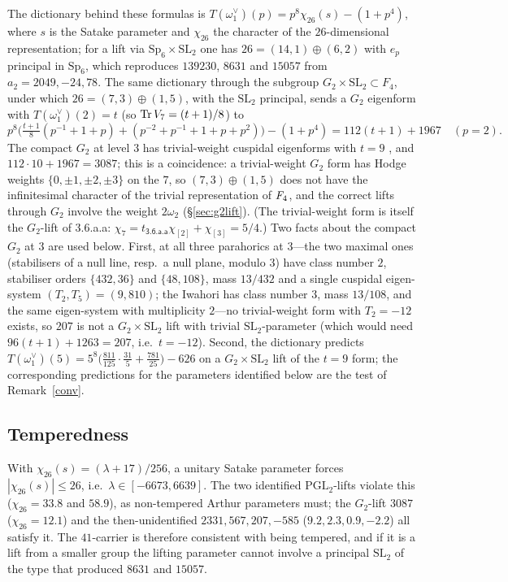 \documentclass[11pt]{amsart}
\theoremstyle{definition}
\begin{document}
The dictionary behind these formulas is $T(\omega_1^\vee)(p)=p^8\chi_{26}(s)-(1+p^4)$, where $s$ is the Satake parameter and $\chi_{26}$ the character of the $26$-dimensional representation; for a lift via $\mathrm{Sp}_6\times\mathrm{SL}_2$ one has $26=(14,1)\oplus(6,2)$ with $e_p$ principal in $\mathrm{Sp}_6$, which reproduces $139230$, $8631$ and $15057$ from $a_2=2049,-24,78$. The same dictionary through the subgroup $G_2\times\mathrm{SL}_2\subset F_4$, under which $26=(7,3)\oplus(1,5)$, with the $\mathrm{SL}_2$ principal, sends a $G_2$ eigenform with $T(\omega_1^\vee)(2)=t$ (so $\operatorname{Tr} V_7=(t+1)/8$) to
\[p^8\Big(\tfrac{t+1}{8}(p^{-1}+1+p)+(p^{-2}+p^{-1}+1+p+p^2)\Big)-(1+p^4)=112(t+1)+1967\quad(p=2).\]
The compact $G_2$ at level $3$ has trivial-weight cuspidal eigenforms with $t=9$ \cite{LP}, and $112\cdot10+1967=3087$; this is a coincidence: a trivial-weight $G_2$ form has Hodge weights $\{0,\pm1,\pm2,\pm3\}$ on the $7$, so $(7,3)\oplus(1,5)$ does not have the infinitesimal character of the trivial representation of $F_4$, and the correct lifts through $G_2$ involve the weight $2\omega_2$ (\S\ref{sec:g2lift}). (The trivial-weight form is itself the $G_2$-lift of \textsf{3.6.a.a}: $\chi_7=t_{\textsf{3.6.a.a}}\chi_{[2]}+\chi_{[3]}=5/4$.) Two facts about the compact $G_2$ at $3$ are used below. First, at all three parahorics at $3$---the two maximal ones (stabilisers of a null line, resp.\ a null plane, modulo $3$) have class number $2$, stabiliser orders $\{432,36\}$ and $\{48,108\}$, mass $13/432$ and a single cuspidal eigen-system $(T_2,T_5)=(9,810)$; the Iwahori has class number $3$, mass $13/108$, and the same eigen-system with multiplicity $2$---no trivial-weight form with $T_2=-12$ exists, so $207$ is not a $G_2\times\mathrm{SL}_2$ lift with trivial $\mathrm{SL}_2$-parameter (which would need $96(t+1)+1263=207$, i.e.\ $t=-12$). Second, the dictionary predicts $T(\omega_1^\vee)(5)=5^8\big(\tfrac{811}{125}\cdot\tfrac{31}{5}+\tfrac{781}{25}\big)-626$ on a $G_2\times\mathrm{SL}_2$ lift of the $t=9$ form; the corresponding predictions for the parameters identified below are the test of Remark~\ref{conv}.

\subsection{Temperedness} With $\chi_{26}(s)=(\lambda+17)/256$, a unitary Satake parameter forces $|\chi_{26}(s)|\le26$, i.e.\ $\lambda\in[-6673,6639]$. The two identified $\mathrm{PGL}_2$-lifts violate this ($\chi_{26}=33.8$ and $58.9$), as non-tempered Arthur parameters must; the $G_2$-lift $3087$ ($\chi_{26}=12.1$) and the then-unidentified $2331,567,207,-585$ ($9.2,2.3,0.9,-2.2$) all satisfy it. The $41$-carrier is therefore consistent with being tempered, and if it is a lift from a smaller group the lifting parameter cannot involve a principal $\mathrm{SL}_2$ of the type that produced $8631$ and $15057$.
\end{document}
